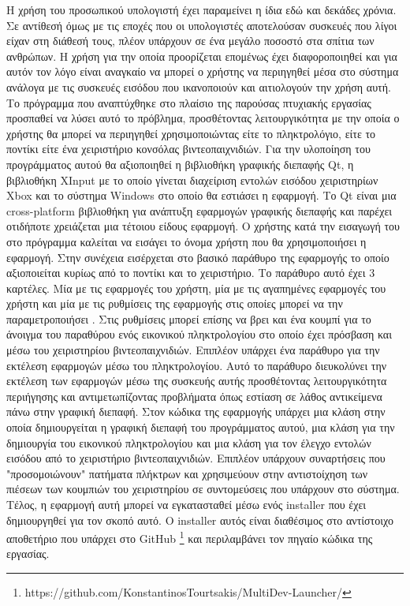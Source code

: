 






Η χρήση του προσωπικού υπολογιστή έχει παραμείνει η ίδια εδώ και δεκάδες χρόνια.
Σε αντίθεσή όμως με τις εποχές που οι υπολογιστές αποτελούσαν συσκευές που λίγοι
είχαν στη διάθεσή τους, πλέον υπάρχουν σε ένα μεγάλο ποσοστό στα σπίτια των
ανθρώπων. Η χρήση για την οποία προορίζεται επομένως έχει διαφοροποιηθεί και
για αυτόν τον λόγο είναι αναγκαίο να μπορεί ο χρήστης να περιηγηθεί μέσα στο σύστημα
ανάλογα με τις συσκευές εισόδου που ικανοποιούν και αιτιολογούν την χρήση αυτή.
Το πρόγραμμα που αναπτύχθηκε στο πλαίσιο της παρούσας πτυχιακής εργασίας 
προσπαθεί να λύσει αυτό το πρόβλημα, προσθέτοντας λειτουργικότητα
με την οποία ο χρήστης θα μπορεί να περιηγηθεί χρησιμοποιώντας είτε το πληκτρολόγιο,
είτε το ποντίκι είτε ένα χειριστήριο κονσόλας βιντεοπαιχνιδιών. Για την υλοποίηση του
προγράμματος αυτού θα αξιοποιηθεί η βιβλιοθήκη γραφικής διεπαφής Qt, η βιβλιοθήκη
XInput με το οποίο γίνεται διαχείριση εντολών εισόδου χειριστηρίων Xbox και το
σύστημα Windows στο οποίο θα εστιάσει η εφαρμογή. Το Qt είναι μια cross-platform βιβλιοθήκη
για ανάπτυξη εφαρμογών γραφικής διεπαφής και παρέχει οτιδήποτε χρειάζεται μια τέτοιου είδους εφαρμογή. Ο χρήστης κατά την εισαγωγή του
στο πρόγραμμα καλείται να εισάγει το όνομα χρήστη που θα χρησιμοποιήσει η εφαρμογή.
Στην συνέχεια εισέρχεται στο βασικό παράθυρο της εφαρμογής το οποίο αξιοποιείται κυρίως
από το ποντίκι και  το χειριστήριο. Το παράθυρο αυτό έχει 3 καρτέλες. Μία με τις εφαρμογές
του χρήστη, μία με τις αγαπημένες εφαρμογές του χρήστη και μία με τις ρυθμίσεις της εφαρμογής
στις οποίες μπορεί να την παραμετροποιήσει . Στις ρυθμίσεις μπορεί επίσης να βρει και ένα
κουμπί για το άνοιγμα του παραθύρου ενός εικονικού πληκτρολογίου στο οποίο έχει πρόσβαση και
μέσω του χειριστηρίου βιντεοπαιχνιδιών. Επιπλέον υπάρχει ένα παράθυρο για την εκτέλεση 
εφαρμογών μέσω του πληκτρολογίου. Αυτό το παράθυρο διευκολύνει την εκτέλεση των εφαρμογών μέσω της
συσκευής αυτής προσθέτοντας λειτουργικότητα περιήγησης και αντιμετωπίζοντας προβλήματα
όπως εστίαση σε λάθος αντικείμενα πάνω στην γραφική διεπαφή. Στον κώδικα της εφαρμογής υπάρχει
μια κλάση στην οποία δημιουργείται η γραφική διεπαφή του προγράμματος αυτού, μια κλάση για την
δημιουργία του εικονικού πληκτρολογίου και μια κλάση για τον έλεγχο εντολών εισόδου από το
χειριστήριο βιντεοπαιχνιδιών. Επιπλέον υπάρχουν συναρτήσεις που "προσομοιώνουν" πατήματα πλήκτρων
και χρησιμεύουν στην αντιστοίχηση των πιέσεων των κουμπιών του χειριστηρίου σε συντομεύσεις που
υπάρχουν στο σύστημα. Τέλος, η εφαρμογή αυτή μπορεί να εγκατασταθεί μέσω ενός installer που έχει
δημιουργηθεί για τον σκοπό αυτό. Ο installer αυτός είναι διαθέσιμος στο αντίστοιχο αποθετήριο που
υπάρχει στο GitHub \footnote{https://github.com/KonstantinosTourtsakis/MultiDev-Launcher/} και περιλαμβάνει τον πηγαίο κώδικα της εργασίας.






